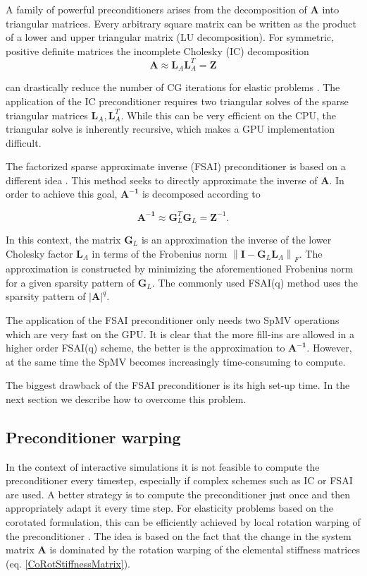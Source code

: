 A family of powerful preconditioners arises from the decomposition of $\mathbf{A}$ into triangular matrices. Every arbitrary square matrix can be written as the product of a lower and upper triangular matrix (LU decomposition). For symmetric, positive definite matrices the incomplete Cholesky (IC) decomposition 
\begin{equation}
\mathbf{A} \approx \mathbf{L}_A \mathbf{L}_A^T = \mathbf{Z}
\end{equation}

can drastically reduce the number of CG iterations for elastic problems \cite{Courtecuisse2010}. The application of the IC preconditioner requires two triangular solves of the sparse triangular matrices $\mathbf{L}_A,\mathbf{L}_A^T$. While this can be very efficient on the CPU, the triangular solve is inherently recursive, which makes a GPU implementation difficult.

The factorized sparse approximate inverse (FSAI) preconditioner is based on a different idea \cite{Kolotilina1993}. This method seeks to directly approximate the inverse of $\mathbf{A}$. In order to achieve this goal, $\mathbf{A^{-1}}$ is decomposed according to 

\begin{equation}
\mathbf{A^{-1}} \approx \mathbf{G}_L ^T \mathbf{G}_L = \mathbf{Z}^{-1}.
\end{equation}

In this context, the matrix $\mathbf{G}_L$ is an approximation the inverse of the lower Cholesky factor $\mathbf{L}_A$ in terms of the Frobenius norm $\left\| \mathbf{I}- \mathbf{G}_L \mathbf{L}_A  \right\|_F$. The approximation is constructed by minimizing the aforementioned Frobenius norm for a given sparsity pattern of $\mathbf{G}_L$. The commonly used FSAI(q) method uses the sparsity pattern of $\left| \mathbf{A} \right| ^q$.

The application of the FSAI preconditioner only needs two SpMV operations which are very fast on the GPU. It is clear that the more fill-ins are allowed in a higher order FSAI(q) scheme, the better is the approximation to $\mathbf{A^{-1}}$. However, at the same time the SpMV becomes increasingly time-consuming to compute. 

The biggest drawback of the FSAI preconditioner is its high set-up time. In the next section we describe how to overcome this problem.


\subsection{Preconditioner warping}
\label{PreconditionerWarping}
In the context of interactive simulations it is not feasible to compute the preconditioner every timestep, especially if complex schemes such as IC or FSAI are used. A better strategy is to compute the preconditioner just once and then appropriately adapt it every time step. For elasticity problems based on the corotated formulation, this can be efficiently achieved by local rotation warping of the preconditioner \cite{Courtecuisse2010}. The idea is based on the fact that the change in the system matrix $\mathbf{A}$ is dominated by the rotation warping of the elemental stiffness matrices (eq. \ref{CoRotStiffnessMatrix}). 

